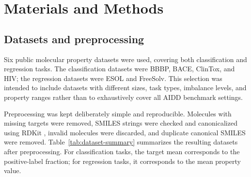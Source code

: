 \section{Materials and Methods}

\subsection{Datasets and preprocessing}

Six public molecular property datasets were used, covering both classification and regression tasks. The classification datasets were BBBP, BACE, ClinTox, and HIV; the regression datasets were ESOL and FreeSolv. This selection was intended to include datasets with different sizes, task types, imbalance levels, and property ranges rather than to exhaustively cover all AIDD benchmark settings.

Preprocessing was kept deliberately simple and reproducible. Molecules with missing targets were removed, SMILES strings were checked and canonicalized using RDKit \citep{rdkit}, invalid molecules were discarded, and duplicate canonical SMILES were removed. Table~\ref{tab:dataset-summary} summarizes the resulting datasets after preprocessing. For classification tasks, the target mean corresponds to the positive-label fraction; for regression tasks, it corresponds to the mean property value.

\begin{table}[H]
\centering
\caption{Dataset summary after preprocessing. For classification datasets, target mean corresponds to the positive-label fraction.}
\label{tab:dataset-summary}
\end{table}


